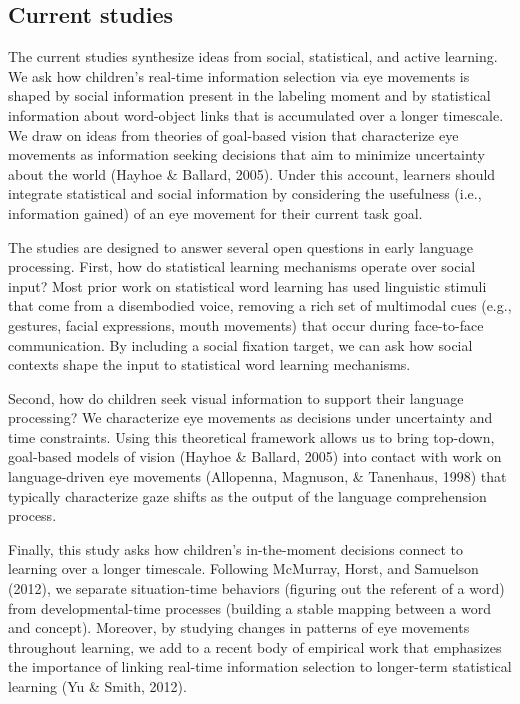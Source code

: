 \documentclass[man,floatsintext]{apa6}
\begin{document}
\subsection{Current studies}\label{current-studies}

The current studies synthesize ideas from social, statistical, and
active learning. We ask how children's real-time information selection
via eye movements is shaped by social information present in the
labeling moment and by statistical information about word-object links
that is accumulated over a longer timescale. We draw on ideas from
theories of goal-based vision that characterize eye movements as
information seeking decisions that aim to minimize uncertainty about the
world (Hayhoe \& Ballard, 2005). Under this account, learners should
integrate statistical and social information by considering the
usefulness (i.e., information gained) of an eye movement for their
current task goal.

The studies are designed to answer several open questions in early
language processing. First, how do statistical learning mechanisms
operate over social input? Most prior work on statistical word learning
has used linguistic stimuli that come from a disembodied voice, removing
a rich set of multimodal cues (e.g., gestures, facial expressions, mouth
movements) that occur during face-to-face communication. By including a
social fixation target, we can ask how social contexts shape the input
to statistical word learning mechanisms.

Second, how do children seek visual information to support their
language processing? We characterize eye movements as decisions under
uncertainty and time constraints. Using this theoretical framework
allows us to bring top-down, goal-based models of vision (Hayhoe \&
Ballard, 2005) into contact with work on language-driven eye movements
(Allopenna, Magnuson, \& Tanenhaus, 1998) that typically characterize
gaze shifts as the output of the language comprehension process.

Finally, this study asks how children's in-the-moment decisions connect
to learning over a longer timescale. Following McMurray, Horst, and
Samuelson (2012), we separate situation-time behaviors (figuring out the
referent of a word) from developmental-time processes (building a stable
mapping between a word and concept). Moreover, by studying changes in
patterns of eye movements throughout learning, we add to a recent body
of empirical work that emphasizes the importance of linking real-time
information selection to longer-term statistical learning (Yu \& Smith,
2012).
\end{document}

